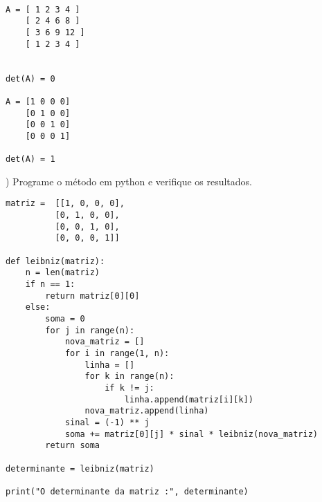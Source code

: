 \documentclass{article}
\begin{document}
\begin{lstlisting}

A = [ 1 2 3 4 ]
    [ 2 4 6 8 ]
    [ 3 6 9 12 ]
    [ 1 2 3 4 ]

    
det(A) = 0

A = [1 0 0 0]
    [0 1 0 0]
    [0 0 1 0]
    [0 0 0 1]
    
det(A) = 1

\end{lstlisting}

) Programe o método em python e verifique os resultados.

\begin{lstlisting}
matriz =  [[1, 0, 0, 0],
          [0, 1, 0, 0],
          [0, 0, 1, 0],
          [0, 0, 0, 1]]

def leibniz(matriz):
    n = len(matriz)
    if n == 1:
        return matriz[0][0]
    else:
        soma = 0
        for j in range(n):
            nova_matriz = []
            for i in range(1, n):
                linha = []
                for k in range(n):
                    if k != j:
                        linha.append(matriz[i][k])
                nova_matriz.append(linha)
            sinal = (-1) ** j
            soma += matriz[0][j] * sinal * leibniz(nova_matriz)
        return soma

determinante = leibniz(matriz)

print("O determinante da matriz :", determinante)

\end{lstlisting}
\end{document}
